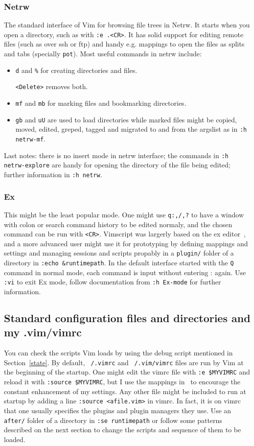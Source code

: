 \documentclass{article}
\newcommand{\ttt}[1] {
	\texttt{<#1>}}
\newcommand{\tttt}[1] {
	\texttt{#1}}
\begin{document}
\subsubsection{Netrw}\label{netrw}
The standard interface of Vim for browsing file trees in Netrw.
It starts when you open a directory, such as with \tttt{:e .<CR>}.
It has solid support for editing remote files (such as over ssh or
ftp) and handy e.g. mappings to open the files as splits and tabs (specially \tttt{pot}).
Most useful commands in netrw include:
\begin{itemize}
  \item \tttt{d} and \tttt{\%} for creating directories and files.
    \ttt{Delete} removes both.
  \item \tttt{mf} and \tttt{mb} for marking files and bookmarking directories.
  \item \tttt{gb} and \tttt{uU} are used to load directories
    while marked files might be copied, moved, edited, greped, tagged and migrated
    to and from the argslist as in \tttt{:h netrw-mf}.
\end{itemize}
Last notes:
there is no insert mode in netrw interface;
the commands in \tttt{:h netrw-explore} are
handy for opening the directory of the
file being edited;
further information in \tttt{:h netrw}.

\subsubsection{Ex}
This might be the least popular mode.
One might use \tttt{q:,/,?} to have a window
with colon or search command history to be edited normaly,
and the chosen command can be run with \ttt{CR}.
Vimscript was largerly based on the ex editor~\cite{ex},
and a more advanced user might use it for prototyping
by defining mappings and settings and managing sessions and scripts
propably in a \tttt{plugin/} folder of a directory in \tttt{:echo \&runtimepath}.
In the default interface started with the \tttt{Q} command in normal mode,
each command is input without entering : again. Use \tttt{:vi} to exit Ex mode,
follow documentation from \tttt{:h Ex-mode} for further information.

\subsection{Standard configuration files and directories and my .vim/vimrc}
You can check the scripts Vim loads by using the debug script mentioned
in Section~\ref{state}.
By default, \tttt{~/.vimrc} and \tttt{~/.vim/vimrc} files are run by Vim at the beginning of the startup.
One might edit the vimrc file with \tttt{:e \$MYVIMRC}
and reload it with \tttt{:source \$MYVIMRC}, but
I use the mappings in~\cite{vimrc} to encourage the constant enhancement of my settings.
Any other file might be included to run at startup by
adding a line \tttt{:source <afile.vim>} in vimrc.
In fact, it is on vimrc that one usually specifies the plugins
and plugin managers they use.
Use an \tttt{after/} folder of a directory in \tttt{:se runtimepath}
or follow some patterns described on the next section to change the
scripts and sequence of them to be loaded.
\end{document}
